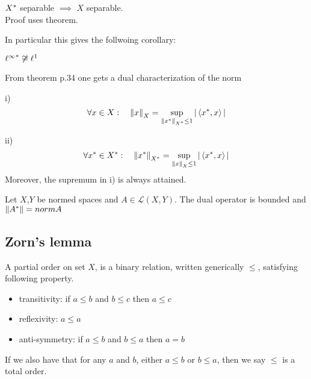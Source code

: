         \begin{theorem}
            ${X}^*$ separable $\implies$ $X$ separable.
            \\
            Proof uses theorem.
        \end{theorem}
In particular this gives the follwoing corollary:
\begin{corollary}
    ${\ell^\infty}^*\not\cong \ell^1$
\end{corollary}

From theorem p.34 one gets a dual characterization of the norm
\begin{corollary}\rm\nextline
    i) 
    $$
    \forall x\in X:\quad\left\|{x}\right\|_X=\sup_{\left\|{{x}^*}\right\|_{{X}^*}\leq1}|\left<{{x}^*},{x}\right>|
    $$

     ii) 
     $$
     \forall {{x}^*}\in {{X}^*}:\quad\left\|{{{x}^*}}\right\|_{{X}^*}=\sup_{\left\|{x}\right\|_{X}\leq1}|\left<{{x}^*},{x}\right>|$$
Moreover, the supremum in i) is always attained.
\begin{pf}{}{}
    
\end{pf}

\end{corollary}

\begin{theorem}
    Let $X$,$Y$ be normed spaces and $A\in\mathcal{L}(X,Y)$. The dual operator  is bounded and $\left\|{{A}^*}\right\|=norm{A}$
\end{theorem}
\subsection{Zorn's lemma}
\begin{definition}\rm \nextline
    A partial order on set $X$, is a binary relation, written generically $\leq$, satisfying following property.
    \begin{itemize}
        \item transitivity: if $a\leq b$ and $b\leq c$ then $a\leq c$
        \item reflexivity: $a\leq a$
        \item anti-symmetry: if $a\leq b$ and $b\leq a$ then $a=b$

    \end{itemize}
    If we also have that for any $a$ and $b$, either $a\leq b$ or $b\leq a$, then we say $\leq$ is a total order.

\end{definition}

